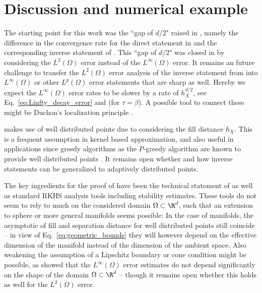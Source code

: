 \documentclass[a4paper, 10pt]{article}
\begin{document}
%
%
%
%
%
%
%
%



%
%
%
%
%
%
%
%
%
%
%
%
%
%
%
%
%
%
%
%
%
%
%
%
%
%
%
%
%
%
%
%
%
%
%
%
%
%
%
%
%
%
%
%
%
%
%
%
%
%
%
%
%
%
%
%
%
%
%
%
%
%
%
%
%
%
%
%
%
%
%
%
%
%
%
%
%
%
%
%
%


\section{Discussion and numerical example} \label{sec:discussion_remarks}

The starting point for this work was the ``gap of $d/2$" raised in \cite{schaback2002inverse}, 
namely the difference in the convergence rate for the direct statement in  and the corresponding inverse statement of .
This ``gap of $d/2$" was closed in  by considering the $L^2(\Omega)$ error instead of the $L^\infty(\Omega)$ error.
It remains an future challenge to transfer the $L^2(\Omega)$ error analysis of the inverse statement from  into $L^\infty(\Omega)$ or other $L^p(\Omega)$ error statements that are sharp as well. 
Hereby we expect the $L^\infty(\Omega)$ error rates to be slower by a rate of $h_{X}^{d/2}$, 
see Eq.~\eqref{eq:Linfty_decay_error} and  (for $\tau = \beta$).
A possible tool to connect these might be Duchon's localization principle \cite{duchon1978erreur, wendland1997sobolev}.

 makes use of well distributed points due to considering the fill distance $h_{X}$.
This is a frequent assumption in kernel based approximation, and also useful in applications since greedy algorithms as the $P$-greedy algorithm are known to provide well distributed points \cite[Theorem 19 \& 20]{wenzel2021novel}.
It remains open whether and how inverse statements can be generalized to adaptively distributed points.

The key ingredients for the proof of  have been the technical statement of  as well as standard RKHS analysis tools including stability estimates.
These tools do not seem to rely to much on the considered domain $\Omega \subset \R^d$, such that an extension to sphere or more general manifolds seems possible: 
In the case of manifolds, the asymptotic of fill and separation distance for well distributed points still coincide 
-- in view of Eq.~\eqref{eq:geometric_bounds} they will however depend on the effective dimension of the manifold instead of the dimension of the ambient space.
%
Also weakening the assumption of a Lipschitz boundary or cone condition might be possible, 
as \cite{wenzel2022stability} showed that the $L^\infty(\Omega)$ error estimates do not depend significantly on the shape of the domain $\Omega \subset \R^d$ 
-- though it remains open whether this holds as well for the $L^2(\Omega)$ error.
\end{document}
